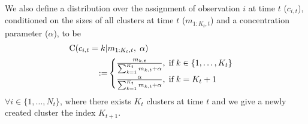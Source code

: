\documentclass[twocolumn, final]{svjour3}
\begin{document}
We also define a distribution over the assignment of observation $i$ at time $t$ ($c_{i,t}$), conditioned on the sizes of all clusters at time $t$ ($m_{1:K_{t},t}$) and a concentration parameter ($\alpha$), to be
\begin{equation}
\begin{split}
\label{C_distro}
\text{C} ( c_{i,t} = k | &m_{1:K_{t},t}, \hspace{1mm} \alpha)\\ :=
& \begin{cases}
\frac{m_{k,t}}{\sum_{k=1}^{K_{t}} m_{k,t} + \alpha}, \hspace{1mm} \text{if} \hspace{1mm} k \in \{ 1, \ldots, K_{t} \} \\
\frac{\alpha}{\sum_{k=1}^{K_{t}} m_{k,t} + \alpha}, \hspace{1mm} \text{if} \hspace{1mm} k = K_{t} + 1
\end{cases}
\end{split}
\end{equation}
$\forall i \in \{1, \ldots, N_{t} \}$, where there exists $K_{t}$ clusters at time $t$ and we give a newly created cluster the index $K_{t+1}$.
\end{document}
